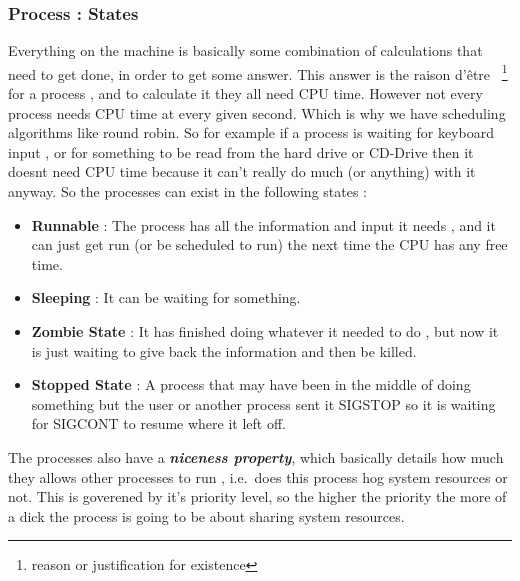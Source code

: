 

\subsubsectionend

\subsubsection{Process : States}
\label{sssec:process_states}

Everything on the machine is basically some combination of calculations that
need to get done, in order to get some answer. This answer is the raison d'être
~\footnote{reason or justification for existence} for a process , and to
calculate it they all need CPU time. However not every process needs CPU time at
every given second. Which is why we have scheduling algorithms like round robin.
So for example if a process is waiting for keyboard input , or for something to
be read from the hard drive or CD-Drive then it doesnt need CPU time because it
can't really do much (or anything) with it anyway. So the processes can exist in
the following states :


\begin{itemize}[noitemsep]

	\item \textbf{Runnable} : The process has all the information and input it
		needs , and it can just get run (or be scheduled to run) the next time
		the CPU has any free time.

	\item \textbf{Sleeping} : It can be waiting for something.

	\item \textbf{Zombie State} : It has finished doing whatever it needed to do
		, but now it is just waiting to give back the information and then be
		killed.

	\item \textbf{Stopped State} : A process that may have been in the middle of
		doing something but the user or another process sent it SIGSTOP so it is
		waiting for SIGCONT to resume where it left off.

\end{itemize}


The processes also have a \textbf{\textit{niceness property}}, which basically
details how much they allows other processes to run , i.e.\ does this process
hog system resources or not. This is goverened by it's priority level, so the
higher the priority the more of a dick the process is going to be about sharing
system resources.

